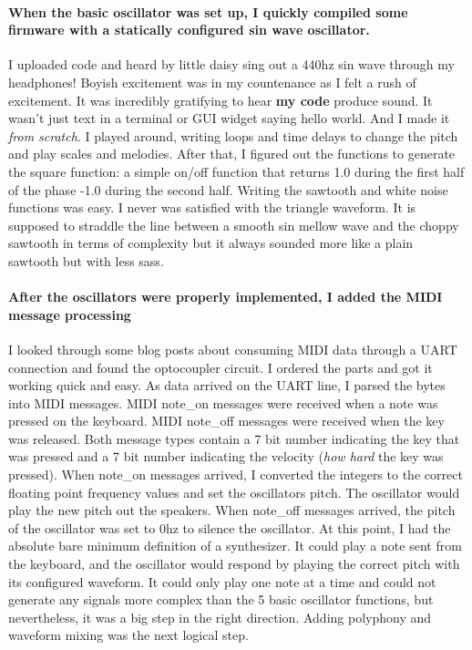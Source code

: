\documentclass[acmlarge,screen]{acmart}
\begin{document}
	\paragraph{When the basic oscillator was set up, I quickly compiled some firmware with a statically configured sin wave oscillator.} I uploaded code and heard by little daisy sing out a 440hz sin wave through my headphones! Boyish excitement was in my countenance as I felt a rush of excitement. It was incredibly gratifying to hear \textbf{my code} produce sound. It wasn't just text in a terminal or GUI widget saying hello world. And I made it \textit{from scratch}. I played around, writing loops and time delays to change the pitch and play scales and melodies. After that, I figured out the functions to generate the square function: a simple on/off function that returns 1.0 during the first half of the phase -1.0 during the second half. Writing the sawtooth and white noise functions was easy. I never was satisfied with the triangle waveform. It is supposed to straddle the line between a smooth sin mellow wave and the choppy sawtooth in terms of complexity but it always sounded more like a plain sawtooth but with less sass.
	
	\paragraph{After the oscillators were properly implemented, I added the MIDI message processing} I looked through some blog posts about consuming MIDI data through a UART connection and found the optocoupler circuit. I ordered the parts and got it working quick and easy. As data arrived on the UART line, I parsed the bytes into MIDI messages. MIDI note\_on messages were received when a note was pressed on the keyboard. MIDI note\_off messages were received when the key was released. Both message types contain a 7 bit number indicating the key that was pressed and a 7 bit number indicating the velocity (\textit{how hard} the key was pressed). When note\_on messages arrived, I converted the integers to the correct floating point frequency values and set the oscillators pitch. The oscillator would play the new pitch out the speakers. When note\_off messages arrived, the pitch of the oscillator was set to 0hz to silence the oscillator. At this point, I had the absolute bare minimum definition of a synthesizer. It could play a note sent from the keyboard, and the oscillator would respond by playing the correct pitch with its configured waveform. It could only play one note at a time and could not generate any signals more complex than the 5 basic oscillator functions, but nevertheless, it was a big step in the right direction. Adding polyphony and waveform mixing was the next logical step.
\end{document}
